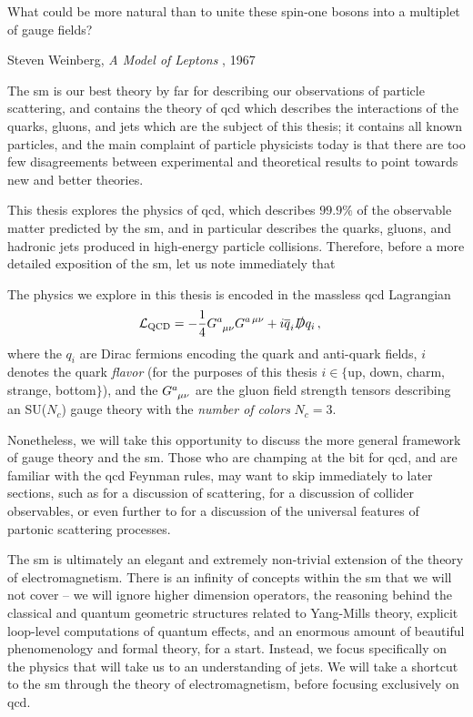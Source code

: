 \epigraph{What could be more natural than to unite these spin-one bosons into a multiplet of gauge fields?}{Steven Weinberg, \textit{A Model of Leptons} \cite{}, 1967}

The \gls{sm} is our best theory by far for describing our observations of particle scattering, and contains the theory of \gls{qcd} which describes the interactions of the quarks, gluons, and jets which are the subject of this thesis;
%
it contains all known particles, and the main complaint of particle physicists today is that there are too few disagreements between experimental and theoretical results to point towards new and better theories.

This thesis explores the physics of \gls{qcd}, which describes \(99.9\%\) of the observable matter predicted by the \gls{sm}, and in particular describes the quarks, gluons, and hadronic jets produced in high-energy particle collisions.
%
Therefore, before a more detailed exposition of the \gls{sm}, let us note immediately that
\begin{answer}
    The physics we explore in this thesis is encoded in the massless \gls{qcd} Lagrangian
    \begin{align}
        \label{eq:qcd-lagrangian}
        \mathcal{L}_\text{QCD}
        &=
        - \frac{1}{4} G\indices{^a_{\mu\nu}} G^{a\,\mu\nu}
        +
        i \overline{q}_i \slashed{D} q_i
        \,,
    \end{align}
    where the \(q_i\) are Dirac fermions encoding the quark and anti-quark fields, \(i\) denotes the quark \textit{flavor} (for the purposes of this thesis \(i \in \{\)up, down, charm, strange, bottom\(\}\)), and the \(G\indices{^a_{\mu\nu}}\) are the gluon field strength tensors describing an SU(\(N_c\)) gauge theory with the \textit{number of colors} \(N_c = 3\).
\end{answer}

\noindent
Nonetheless, we will take this opportunity to discuss the more general framework of gauge theory and the \gls{sm}.
%
Those who are champing at the bit for \gls{qcd}, and are familiar with the \gls{qcd} Feynman rules, may want to skip immediately to later sections, such as  for a discussion of scattering,  for a discussion of collider observables, or even further to  for a discussion of the universal features of partonic scattering processes.


The \gls{sm} is ultimately an elegant and extremely non-trivial extension of the theory of electromagnetism.
%
There is an infinity of concepts within the \gls{sm} that we will not cover -- we will ignore higher dimension operators, the reasoning behind the classical and quantum geometric structures related to Yang-Mills theory, explicit loop-level computations of quantum effects, and an enormous amount of beautiful phenomenology and formal theory, for a start.
%
Instead, we focus specifically on the physics that will take us to an understanding of jets.
%
We will take a shortcut to the \gls{sm} through the theory of electromagnetism, before focusing exclusively on \gls{qcd}.

